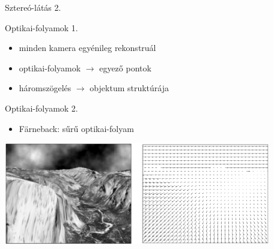 \documentclass[17pt,xcolor=x11names]{beamer}
\begin{document}
\begin{frame}{Sztereó-látás 2.}
\begin{center}
\end{center}
\end{frame}

\begin{frame}{Optikai-folyamok 1.}
\begin{itemize}
\item minden kamera egyénileg rekonstruál
\item optikai-folyamok $\rightarrow$ egyező pontok
\item háromszögelés $\rightarrow$ objektum struktúrája
\end{itemize}
\end{frame}

\begin{frame}{Optikai-folyamok 2.}
\begin{itemize}
\item Färneback: sűrű optikai-folyam
\end{itemize}
\begin{center}
\includegraphics[width=330pt]{figures/farneback.png}
\end{center}
\end{frame}
\end{document}
